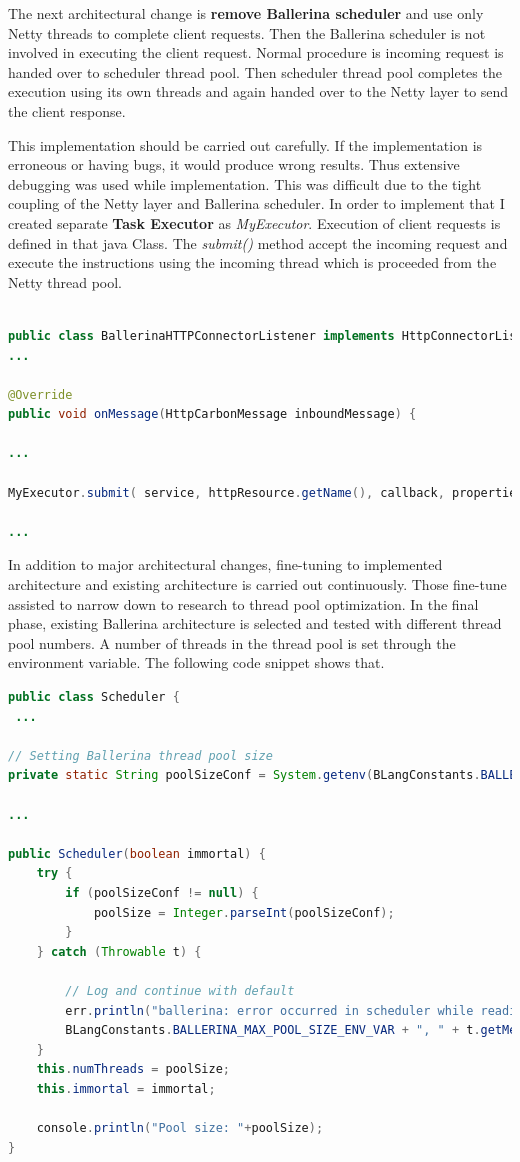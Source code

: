The next architectural change is \textbf{remove Ballerina scheduler} and use only Netty threads to complete client requests. Then the Ballerina scheduler is not involved in executing the client request. Normal procedure is incoming request is handed over to scheduler thread pool. Then scheduler thread pool completes the execution using its own threads and again handed over to the Netty layer to send the client response. 

This implementation should be carried out carefully. If the implementation is erroneous or having bugs, it would produce wrong results. Thus extensive debugging was used while implementation. This was difficult due to the tight coupling of the Netty layer and Ballerina scheduler. In order to implement that I created separate \textbf{Task Executor} as \textit{MyExecutor}. Execution of client requests is defined in that java Class. The \textit{submit()} method accept the incoming request and execute the instructions using the incoming thread which is proceeded from the Netty thread pool.


\begin{lstlisting}[language=Java]

public class BallerinaHTTPConnectorListener implements HttpConnectorListener {
...

@Override
public void onMessage(HttpCarbonMessage inboundMessage) {

...

MyExecutor.submit( service, httpResource.getName(), callback, properties, signatureParams);

...

\end{lstlisting}


In addition to major architectural changes, fine-tuning to implemented architecture and existing architecture is carried out continuously. Those fine-tune assisted to narrow down to research to thread pool optimization. In the final phase, existing Ballerina architecture is selected and tested with different thread pool numbers. A number of threads in the thread pool is set through the environment variable. The following code snippet shows that.


\begin{lstlisting}[language=Java]
public class Scheduler {
 ...

// Setting Ballerina thread pool size 
private static String poolSizeConf = System.getenv(BLangConstants.BALLERINA_MAX_POOL_SIZE_ENV_VAR);

...

public Scheduler(boolean immortal) {
	try {
 		if (poolSizeConf != null) {
  			poolSize = Integer.parseInt(poolSizeConf);
 		}
	} catch (Throwable t) {
	
		// Log and continue with default
		err.println("ballerina: error occurred in scheduler while reading system variable:" +
		BLangConstants.BALLERINA_MAX_POOL_SIZE_ENV_VAR + ", " + t.getMessage());
	}
	this.numThreads = poolSize;
	this.immortal = immortal;

	console.println("Pool size: "+poolSize);
}

\end{lstlisting}



